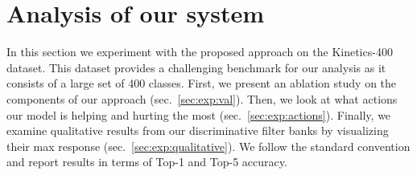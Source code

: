 \documentclass[10pt,twocolumn,letterpaper]{article}
\begin{document}
\begin{table}
\centering
{}
\vspace{2mm}
\caption{\it Results of the different components of our model on the Kinetics-400 dataset. Our baseline, which consists of a single global branch (GB) is consistently outperformed by our discriminative filters (DF) and add our specialized local branch (LB) compliments these filters, pushing performance even higher.  Performance is computed using the training-time setting. Thus, 2D models use 3 segments while 3D models use one 16-frame segment. \vspace{-7mm}}
\label{tab:3d_abl}
\end{table}


\section{Analysis of our system} 
\label{sec:ablationstudy}

In this section we experiment with the proposed approach on the Kinetics-400 dataset. This dataset provides a challenging benchmark for our analysis as it consists of a large set of 400 classes. First, we present an ablation study on the components of our approach (sec.~\ref{sec:exp:val}). Then, we look at what actions our model is helping and hurting the most (sec.~\ref{sec:exp:actions}). Finally, we examine qualitative results from our discriminative filter banks by visualizing their max response (sec.~\ref{sec:exp:qualitative}). We follow the standard convention and report results in terms of Top-1 and Top-5 accuracy.
\end{document}
